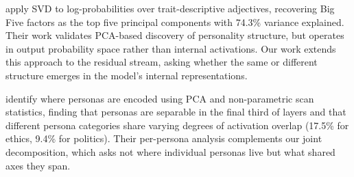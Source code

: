 \citet{suh2024rediscovering} apply SVD to log-probabilities over trait-descriptive adjectives, recovering Big Five factors as the top five principal components with 74.3\% variance explained. Their work validates PCA-based discovery of personality structure, but operates in output probability space rather than internal activations. Our work extends this approach to the residual stream, asking whether the same or different structure emerges in the model's internal representations.

\citet{cintas2025localizing} identify where personas are encoded using PCA and non-parametric scan statistics, finding that personas are separable in the final third of layers and that different persona categories share varying degrees of activation overlap (17.5\% for ethics, 9.4\% for politics). Their per-persona analysis complements our joint decomposition, which asks not where individual personas live but what shared axes they span.
